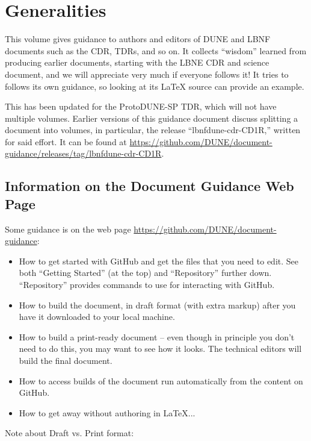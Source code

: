 \chapter{Generalities}
\label{ch:generalities}

This volume gives guidance to authors and editors of DUNE and LBNF documents such as the CDR, TDRs, and so on. It collects ``wisdom'' learned from 
producing earlier documents, starting with the LBNE CDR and science document, and we will appreciate 
very much if everyone follows it!  It tries to follows its own guidance, so looking at its \LaTeX{} source can 
provide an example.  

This has been updated for the ProtoDUNE-SP TDR, which will not have multiple volumes. Earlier versions of this guidance document discuss splitting a document into volumes, in particular, the release ``lbnfdune-cdr-CD1R,'' written for said effort.  It can be found at \url{https://github.com/DUNE/document-guidance/releases/tag/lbnfdune-cdr-CD1R}.


\section{Information on the Document Guidance Web Page}
\label{ssec:files-webpage}

Some guidance is on the web page \url{https://github.com/DUNE/document-guidance}:

\begin{itemize}
\item How to get started with GitHub and get the files that you need to edit. See both ``Getting Started'' (at the top) and ``Repository'' further down.  ``Repository'' provides commands to use for interacting with GitHub.
\item How to build the document, in draft format (with extra markup) after you have it downloaded to your local machine.
\item How to build a print-ready document -- even though in principle you don't need to do this, you may want to see how it looks. The technical editors will build the final document.
\item How to access builds of the document run automatically from the content on GitHub.
\item How to get away without authoring in \LaTeX{}...
\end{itemize}

Note about Draft vs. Print format: 

